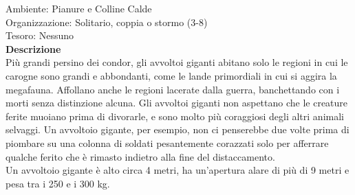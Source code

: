 \begin{multicols}{2}
Ambiente: Pianure e Colline Calde\\
Organizzazione: Solitario, coppia o stormo (3-8)\\
Tesoro: Nessuno\\
\textbf{Descrizione}\\
Più grandi persino dei condor, gli avvoltoi giganti abitano solo le regioni in cui le carogne sono grandi e abbondanti, come le lande primordiali in cui si aggira la megafauna. Affollano anche le regioni lacerate dalla guerra, banchettando con i morti senza distinzione alcuna. Gli avvoltoi giganti non aspettano che le creature ferite muoiano prima di divorarle, e sono molto più coraggiosi degli altri animali selvaggi. Un avvoltoio gigante, per esempio, non ci penserebbe due volte prima di piombare su una colonna di soldati pesantemente corazzati solo per afferrare qualche ferito che è rimasto indietro alla fine del distaccamento.\\
Un avvoltoio gigante è alto circa 4 metri, ha un'apertura alare di più di 9 metri e pesa tra i 250 e i 300 kg.\\



\end{multicols}
